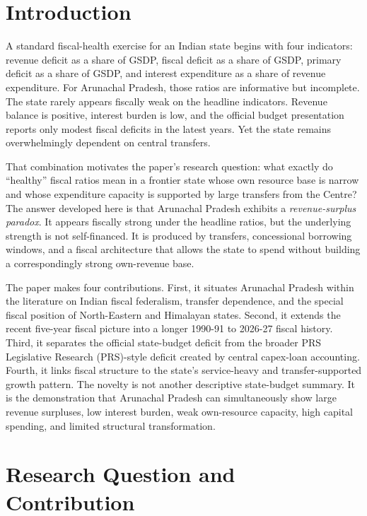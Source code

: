 \documentclass[11pt,a4paper]{article}
\begin{document}
\newpage
\tableofcontents
\newpage

\section{Introduction}

A standard fiscal-health exercise for an Indian state begins with four indicators: revenue deficit as a share of GSDP, fiscal deficit as a share of GSDP, primary deficit as a share of GSDP, and interest expenditure as a share of revenue expenditure. For Arunachal Pradesh, those ratios are informative but incomplete. The state rarely appears fiscally weak on the headline indicators. Revenue balance is positive, interest burden is low, and the official budget presentation reports only modest fiscal deficits in the latest years. Yet the state remains overwhelmingly dependent on central transfers.

That combination motivates the paper's research question: what exactly do ``healthy'' fiscal ratios mean in a frontier state whose own resource base is narrow and whose expenditure capacity is supported by large transfers from the Centre? The answer developed here is that Arunachal Pradesh exhibits a \emph{revenue-surplus paradox}. It appears fiscally strong under the headline ratios, but the underlying strength is not self-financed. It is produced by transfers, concessional borrowing windows, and a fiscal architecture that allows the state to spend without building a correspondingly strong own-revenue base.

The paper makes four contributions. First, it situates Arunachal Pradesh within the literature on Indian fiscal federalism, transfer dependence, and the special fiscal position of North-Eastern and Himalayan states. Second, it extends the recent five-year fiscal picture into a longer 1990-91 to 2026-27 fiscal history. Third, it separates the official state-budget deficit from the broader PRS Legislative Research (PRS)-style deficit created by central capex-loan accounting. Fourth, it links fiscal structure to the state's service-heavy and transfer-supported growth pattern. The novelty is not another descriptive state-budget summary. It is the demonstration that Arunachal Pradesh can simultaneously show large revenue surpluses, low interest burden, weak own-resource capacity, high capital spending, and limited structural transformation.

\section{Research Question and Contribution}
\end{document}
